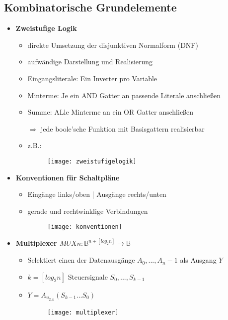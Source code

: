 \subsection{Kombinatorische Grundelemente}
\begin{itemize}

\item \textbf{Zweistufige Logik}
	\begin{itemize}
	\item direkte Umsetzung der disjunktiven Normalform (DNF)
	\item aufwändige Darstellung und Realisierung
	\item Eingangsliterale: Ein Inverter pro Variable
	\item Minterme: Je ein AND Gatter an passende Literale anschließen
	\item Summe: ALle Minterme an ein OR Gatter anschließen
	\item[$\Rightarrow$] jede boole'sche Funktion mit Basisgattern realisierbar
	\item z.B.:
	\item[] \begin{figure}[H]
				\begin{center}
				\texttt{[image: zweistufigelogik]}
				\end{center}
			\end{figure}
	\end{itemize}

\item \textbf{Konventionen für Schaltpläne}
	\begin{itemize}
	\item Eingänge links/oben | Ausgänge rechts/unten
	\item gerade und rechtwinklige Verbindungen
	\item[] \begin{figure}[H]
				\begin{center}
				\texttt{[image: konventionen]}
				\end{center}
			\end{figure}
	\end{itemize}

\item \textbf{Multiplexer $MUXn: \mathbb{B}^{n+[log_2n]} \rightarrow \mathbb{B}$}
	\begin{itemize}
	\item Selektiert einen der Datenausgänge $A_0,...,A_n-1$ als Ausgang $Y$
	\item $k = [log_2n]$ Steuersignale $S_0,...,S_{k-1}$
	\item $Y= A_{u_{2,k}}(S_{k-1}...S_0)$
	\item[] \begin{figure}[H]
				\begin{center}
				\texttt{[image: multiplexer]}
				\end{center}
			\end{figure}
	\end{itemize}
	

\end{itemize}
